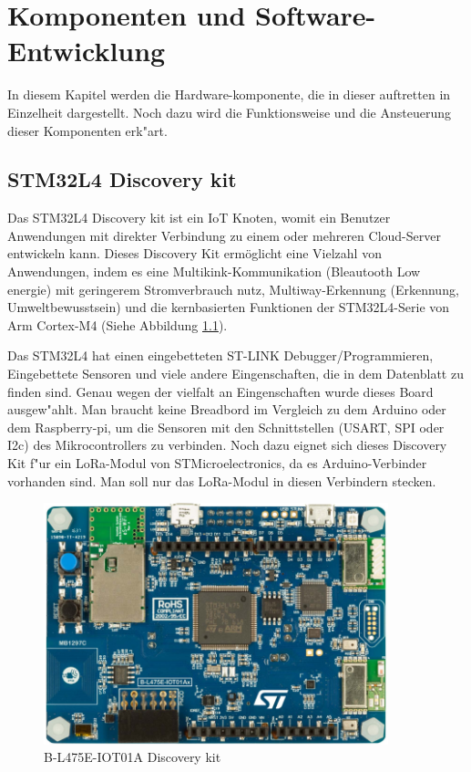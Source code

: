 \chapter{Komponenten und Software-Entwicklung}\label{Komponente}

In diesem Kapitel werden die Hardware-komponente, die in dieser auftretten in Einzelheit dargestellt. Noch dazu wird die Funktionsweise und die Ansteuerung dieser Komponenten erk"art.

\section{STM32L4 Discovery kit}\label{LoRa}

Das STM32L4 Discovery kit ist ein IoT Knoten, womit ein Benutzer Anwendungen mit  direkter Verbindung zu einem oder mehreren Cloud-Server  entwickeln kann. 
Dieses Discovery Kit erm\"oglicht eine Vielzahl von Anwendungen, indem es eine Multikink-Kommunikation (Bleautooth Low energie) mit geringerem Stromverbrauch nutz, Multiway-Erkennung (Erkennung, Umweltbewusstsein) und die kernbasierten   Funktionen der STM32L4-Serie von Arm Cortex\textregistered-M4 (Siehe Abbildung \ref{Node}).

Das STM32L4 hat einen eingebetteten ST-LINK Debugger/Programmieren, Eingebettete Sensoren und viele andere Eingenschaften, die in dem Datenblatt \cite{B-L475E-IOT01A} zu finden sind. Genau wegen der vielfalt an Eingenschaften wurde dieses Board ausgew"ahlt. Man braucht keine Breadbord im Vergleich zu dem Arduino oder dem Raspberry-pi, um die Sensoren mit den Schnittstellen (USART, SPI oder I2c) des Mikrocontrollers zu verbinden. Noch dazu eignet sich dieses Discovery Kit f"ur ein LoRa-Modul von STMicroelectronics, da es Arduino-Verbinder vorhanden sind. Man soll nur das LoRa-Modul in diesen Verbindern stecken. 

\begin{figure}[h]
	\centering
	\includegraphics[width=10cm]{source/images/Board}
	\caption{B-L475E-IOT01A Discovery kit \cite{B-L475E-IOT01A}}\label{Node}
\end{figure}


